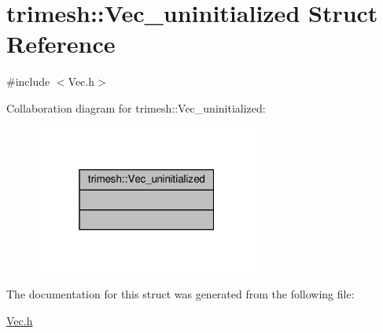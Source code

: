 \hypertarget{structtrimesh_1_1Vec__uninitialized}{}\section{trimesh\+:\+:Vec\+\_\+uninitialized Struct Reference}
\label{structtrimesh_1_1Vec__uninitialized}


{\ttfamily \#include $<$Vec.\+h$>$}



Collaboration diagram for trimesh\+:\+:Vec\+\_\+uninitialized\+:\nopagebreak
\begin{figure}[H]
\begin{center}
\leavevmode
\includegraphics[width=208pt]{d4/dbc/structtrimesh_1_1Vec__uninitialized__coll__graph}
\end{center}
\end{figure}


The documentation for this struct was generated from the following file\+:\begin{DoxyCompactItemize}
\item 
\hyperlink{Vec_8h}{Vec.\+h}\end{DoxyCompactItemize}
